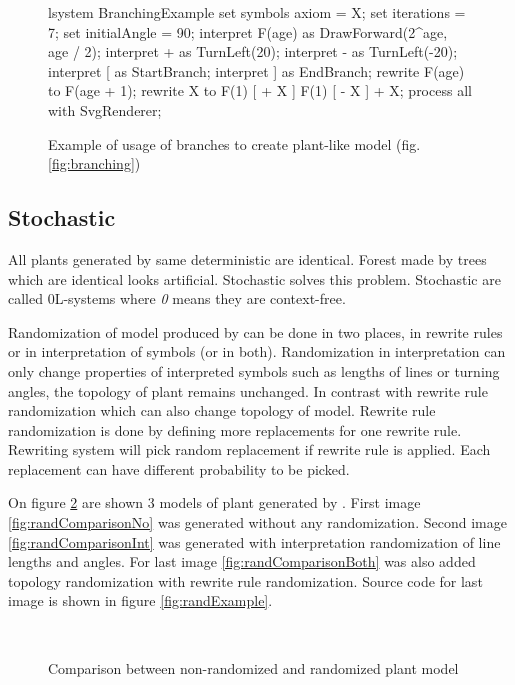 \begin{figure}[ht]
	\begin{Lsystem}
lsystem BranchingExample {
	set symbols axiom = X;
	set iterations = 7;
	set initialAngle = 90;
	interpret F(age) as DrawForward(2^age, age / 2);
	interpret + as TurnLeft(20);
	interpret - as TurnLeft(-20);
	interpret [ as StartBranch;
	interpret ] as EndBranch;
	rewrite F(age) to F(age + 1);
	rewrite X to F(1) [ + X ] F(1) [ - X ] + X;
}
process all with SvgRenderer;
	\end{Lsystem}
	\caption{Example of usage of branches to create plant-like model (fig. \ref{fig:branching})}
	\label{fig:branchingSrc}
\end{figure}



\subsection{Stochastic \lsystems}

All plants generated by same deterministic \lsystem are identical.
Forest made by trees which are identical looks artificial.
Stochastic \lsystems solves this problem.
Stochastic \lsystems are called 0L-systems where \emph{0} means they are context-free.

Randomization of model produced by \lsystem can be done in two places, in rewrite rules or in interpretation of symbols (or in both).
Randomization in interpretation can only change properties of interpreted symbols such as lengths of lines or turning angles, the topology of plant remains unchanged.
In contrast with rewrite rule randomization which can also change topology of model.
Rewrite rule randomization is done by defining more replacements for one rewrite rule.
Rewriting system will pick random replacement if rewrite rule is applied.
Each replacement can have different probability to be picked.

On figure \ref{fig:randComparison} are shown 3 models of plant generated by \lsystems.
First image \ref{fig:randComparisonNo} was generated without any randomization.
Second image \ref{fig:randComparisonInt} was generated with interpretation randomization of line lengths and angles.
For last image \ref{fig:randComparisonBoth} was also added topology randomization with rewrite rule randomization.
Source code for last image is shown in figure \ref{fig:randExample}.

\begin{figure}[ht]
	\centering
	 ~
	 ~
	\caption{Comparison between non-randomized and randomized plant model}
	\label{fig:randComparison}
\end{figure}

